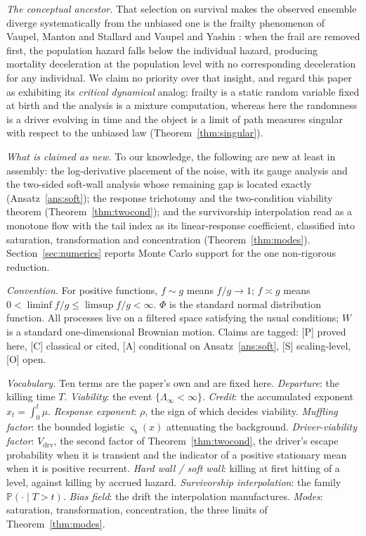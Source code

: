 \documentclass[11pt]{article}
\theoremstyle{definition}
\theoremstyle{remark}
\newcommand{\PP}{\mathbb{P}}
\begin{document}
\emph{The conceptual ancestor.} That selection on survival makes the
observed ensemble diverge systematically from the unbiased one is the
frailty phenomenon of Vaupel, Manton and Stallard \cite{VMS79} and
Vaupel and Yashin \cite{VY85}: when the frail are removed first, the
population hazard falls below the individual hazard, producing
mortality deceleration at the population level with no corresponding
deceleration for any individual. We claim no priority over that
insight, and regard this paper as exhibiting its \emph{critical
dynamical} analog: frailty is a static random variable fixed at birth
and the analysis is a mixture computation, whereas here the randomness
is a driver evolving in time and the object is a limit of path
measures singular with respect to the unbiased law
(Theorem~\ref{thm:singular}).

\emph{What is claimed as new.} To our knowledge, the following are new
at least in assembly: the log-derivative placement of the noise, with
its gauge analysis and the two-sided soft-wall analysis whose
remaining gap is located exactly (Ansatz~\ref{ans:soft}); the response
trichotomy and the two-condition viability theorem
(Theorem~\ref{thm:twocond}); and the survivorship interpolation read
as a monotone flow with the tail index as its linear-response
coefficient, classified into saturation, transformation and
concentration (Theorem~\ref{thm:modes}). Section~\ref{sec:numerics}
reports Monte Carlo support for the one non-rigorous reduction.

\emph{Convention.} For positive functions, $f\sim g$ means $f/g\to1$;
$f\asymp g$ means $0<\liminf f/g\le\limsup f/g<\infty$. $\Phi$ is the
standard normal distribution function. All processes live on a
filtered space satisfying the usual conditions; $W$ is a standard
one-dimensional Brownian motion. Claims are tagged: [P] proved here,
[C] classical or cited, [A] conditional on Ansatz~\ref{ans:soft},
[S] scaling-level, [O] open.

\emph{Vocabulary.} Ten terms are the paper's own and are fixed here.
\emph{Departure}: the killing time $T$. \emph{Viability}: the event
$\{\Lambda_\infty<\infty\}$. \emph{Credit}: the accumulated exponent
$x_t=\int_0^t\mu$. \emph{Response exponent}: $\rho$, the sign of
which decides viability. \emph{Muffling factor}: the bounded logistic
$\varsigma_b(x)$ attenuating the background. \emph{Driver-viability factor}:
$V_{\mathrm{drv}}$, the second factor of Theorem~\ref{thm:twocond},
the driver's escape probability when it is transient and the indicator
of a positive stationary mean when it is positive recurrent. \emph{Hard wall / soft wall}: killing at
first hitting of a level, against killing by accrued hazard.
\emph{Survivorship interpolation}: the family
$\PP(\cdot\mid T>t)$. \emph{Bias field}: the drift the interpolation
manufactures. \emph{Modes}: saturation, transformation, concentration,
the three limits of Theorem~\ref{thm:modes}.
\end{document}
